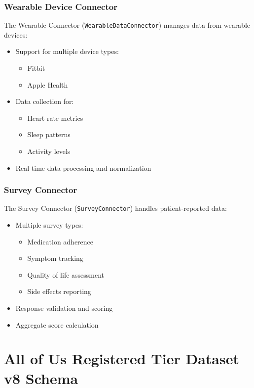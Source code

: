 \documentclass[12pt]{article}
\begin{document}
\subsubsection{Wearable Device Connector}
The Wearable Connector (\texttt{WearableDataConnector}) manages data from wearable devices:
\begin{itemize}
    \item Support for multiple device types:
    \begin{itemize}
        \item Fitbit
        \item Apple Health
    \end{itemize}
    \item Data collection for:
    \begin{itemize}
        \item Heart rate metrics
        \item Sleep patterns
        \item Activity levels
    \end{itemize}
    \item Real-time data processing and normalization
\end{itemize}

\subsubsection{Survey Connector}
The Survey Connector (\texttt{SurveyConnector}) handles patient-reported data:
\begin{itemize}
    \item Multiple survey types:
    \begin{itemize}
        \item Medication adherence
        \item Symptom tracking
        \item Quality of life assessment
        \item Side effects reporting
    \end{itemize}
    \item Response validation and scoring
    \item Aggregate score calculation
\end{itemize}

\section{All of Us Registered Tier Dataset v8 Schema}
\end{document}
